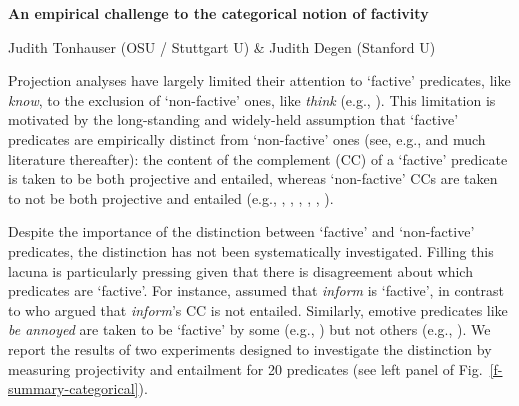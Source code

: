 \documentclass[12pt,fleqn]{article}
\newcommand{\6}{\mbox{$[\hspace*{-.6mm}[$}}
\newcommand{\9}{\mbox{$]\hspace*{-.6mm}]$}}
\begin{document}
 
 
\begin{center}
{\bf An empirical challenge to the categorical notion of factivity}

Judith Tonhauser (OSU / Stuttgart U) \& Judith Degen (Stanford U) 
\end{center}

\vspace*{-.2cm}


\noindent
Projection analyses have largely limited their attention to `factive' predicates, like {\em know}, to the exclusion of `non-factive' ones, like {\em think}  (e.g., \cite{heim83,vds92,abrusan2011,abrusan2016,romoli2015,best-question}). This limitation is motivated by the long-standing and widely-held assumption that `factive' predicates are empirically distinct from `non-factive' ones (see, e.g., \cite{karttunen71b,kiparsky-kiparsky71} and much literature thereafter): the content of the complement (CC) of a `factive' predicate is taken to be both projective and entailed, whereas `non-factive' CCs  are taken to not be both projective and entailed  (e.g., \cite{gazdar79a}, \cite{ccmg90}, \cite{vds92},  \cite{schlenker10}, \cite{anand-hacquard2014}, \cite{spector-egre2015}). 

Despite the importance of the distinction between `factive' and `non-factive' predicates, the distinction has not been systematically investigated. Filling this lacuna is particularly pressing given that there is disagreement about which predicates are `factive'. For instance, \cite{schlenker10} assumed that {\em inform} is `factive', in contrast to \cite{anand-hacquard2014} who argued that \emph{inform}'s CC is not entailed. Similarly, emotive predicates like {\em be annoyed} are taken to be `factive' by some (e.g., \cite{gazdar79a,abrusan2011,anand-hacquard2014}) but not others (e.g., \cite{klein1975,giannakidou1998,schlenker2003,egre2008}). We report the results of two experiments designed to investigate the distinction by measuring projectivity and entailment for 20 predicates (see left panel of Fig.\ \ref{f-summary-categorical}). %
\end{document}

